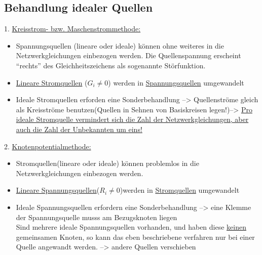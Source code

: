 \subsection{Behandlung idealer Quellen}
1. \underline{Kreisstrom- bzw. Maschenstrommethode:}
\begin{itemize}
	\item Spannungsquellen (lineare oder ideale) können ohne weiteres in die Netzwerkgleichungen einbezogen werden. Die Quellenspannung erscheint "`rechts"' des Gleichheitszeichens als sogenannte Störfunktion.
	\item \underline{Lineare Stromquellen} ($G_{i} \not = 0$) werden in \underline{Spannungsquellen} umgewandelt
	\item Ideale Stromquellen erforden eine Sonderbehandlung --> Quellenströme gleich als Kreisströme benutzen(Quellen in Sehnen von Basiskreisen legen!)--> \underline{Pro ideale Stromquelle vermindert sich die Zahl der Netzwerkgleichungen, aber auch die Zahl der Unbekannten um eins!}
\end{itemize}
2. \underline{Knotenpotentialmethode:}
\begin{itemize}
	\item Stromquellen(lineare oder ideale) können problemlos in die Netzwerkgleichungen einbezogen werden.
	\item \underline{Lineare Spannungsquellen}($R_{i} \not = 0$)werden in \underline{Stromquellen} umgewandelt
	\item Ideale Spannungsquellen erfordern eine Sonderbehandlung --> eine Klemme der Spannungsquelle musss am Bezugsknoten liegen\\
	Sind mehrere ideale Spannungsquellen vorhanden, und haben diese \underline{keinen} gemeinsamen Knoten, so kann das eben beschriebene verfahren nur bei einer Quelle angewandt werden. --> andere Quellen verschieben
\end{itemize}

